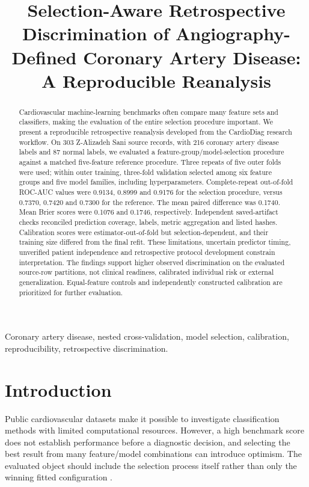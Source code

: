 \documentclass[conference]{IEEEtran}
\title{Selection-Aware Retrospective Discrimination of Angiography-Defined Coronary Artery Disease: A Reproducible Reanalysis}
\author{\IEEEauthorblockN{Authorship pending confirmation}\IEEEauthorblockA{Affiliations and correspondence pending confirmation}}
\begin{document}
\maketitle
\begin{abstract}
Cardiovascular machine-learning benchmarks often compare many feature sets and classifiers, making the evaluation of the entire selection procedure important. We present a reproducible retrospective reanalysis developed from the CardioDiag research workflow. On 303 Z-Alizadeh Sani source records, with 216 coronary artery disease labels and 87 normal labels, we evaluated a feature-group/model-selection procedure against a matched five-feature reference procedure. Three repeats of five outer folds were used; within outer training, three-fold validation selected among six feature groups and five model families, including hyperparameters. Complete-repeat out-of-fold ROC-AUC values were 0.9134, 0.8999 and 0.9176 for the selection procedure, versus 0.7370, 0.7420 and 0.7300 for the reference. The mean paired difference was 0.1740. Mean Brier scores were 0.1076 and 0.1746, respectively. Independent saved-artifact checks reconciled prediction coverage, labels, metric aggregation and listed hashes. Calibration scores were estimator-out-of-fold but selection-dependent, and their training size differed from the final refit. These limitations, uncertain predictor timing, unverified patient independence and retrospective protocol development constrain interpretation. The findings support higher observed discrimination on the evaluated source-row partitions, not clinical readiness, calibrated individual risk or external generalization. Equal-feature controls and independently constructed calibration are prioritized for further evaluation.

\end{abstract}
\begin{IEEEkeywords}
Coronary artery disease, nested cross-validation, model selection, calibration, reproducibility, retrospective discrimination.

\end{IEEEkeywords}
\section{Introduction}
Public cardiovascular datasets make it possible to investigate classification methods with limited computational resources. However, a high benchmark score does not establish performance before a diagnostic decision, and selecting the best result from many feature/model combinations can introduce optimism. The evaluated object should include the selection process itself rather than only the winning fitted configuration \cite{r2}.
\end{document}
